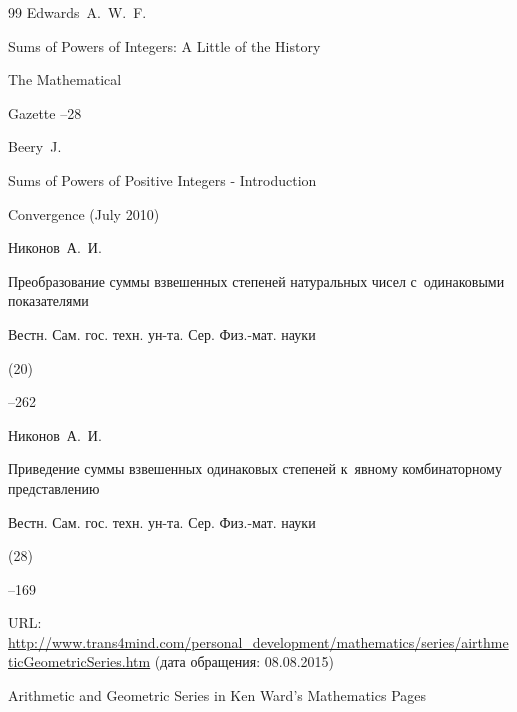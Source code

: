 \begin{thebibliography}{99}
\by Edwards~A.~W.~F. 

\paper Sums of Powers of Integers: A Little of the History 

\jour The Mathematical

Gazette    --28





\by Beery~J.

\preprint Sums of Powers of Positive Integers - Introduction

\preprintinfo Convergence (July 2010)






\by Никонов~А.~И.

\paper Преобразование суммы взвешенных степеней натуральных чисел с~одинаковыми показателями

\jour Вестн. Сам. гос. техн. ун-та. Сер. Физ.-мат. науки


(20)

--262






\by Никонов~А.~И.

\paper Приведение суммы взвешенных одинаковых степеней к~явному комбинаторному представлению

\jour Вестн. Сам. гос. техн. ун-та. Сер. Физ.-мат. науки


(28)

--169






\elink URL: \url{http://www.trans4mind.com/personal_development/mathematics/series/airthmeticGeometricSeries.htm} \Russian (дата обращения: 08.08.2015)

\preprint  Arithmetic and Geometric Series in Ken Ward's Mathematics Pages








\end{thebibliography}
